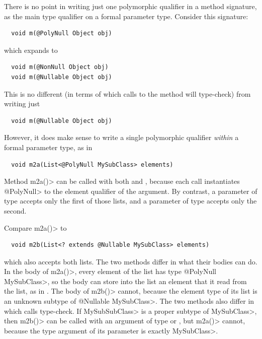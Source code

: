 
There is no point in writing just one polymorphic qualifier in a method
signature, as the main type qualifier on a formal parameter type.
Consider this signature:

\begin{Verbatim}
  void m(@PolyNull Object obj)
\end{Verbatim}

\noindent
which expands to

\begin{Verbatim}
  void m(@NonNull Object obj)
  void m(@Nullable Object obj)
\end{Verbatim}

This is no different (in terms of which calls to the method will
type-check) from writing just

\begin{Verbatim}
  void m(@Nullable Object obj)
\end{Verbatim}

However, it does make sense to write a single polymorphic qualifier
\emph{within} a formal parameter type, as in
\begin{Verbatim}
  void m2a(List<@PolyNull MySubClass> elements)
\end{Verbatim}
Method \<m2a()> can be called with both 
and , because each call instantiates
\<@PolyNull> to the element qualifier of the argument.  By contrast, a
parameter of type  accepts only the first
of those lists, and a parameter of type 
accepts only the second.

Compare \<m2a()> to
\begin{Verbatim}
  void m2b(List<? extends @Nullable MySubClass> elements)
\end{Verbatim}
which also accepts both lists.  The two methods differ in what their bodies
can do.  In the body of \<m2a()>, every element of the list has type
\<@PolyNull MySubClass>, so the body can store into the list an element
that it read from the list, as in .  The
body of \<m2b()> cannot, because the element type of its list is an unknown
subtype of \<@Nullable MySubClass>.  The two methods also differ in which
calls type-check.  If \<MySubSubClass> is a proper subtype of
\<MySubClass>, then \<m2b()> can be called with an argument of type
 or , but \<m2a()> cannot, because the type argument of its
parameter is exactly \<MySubClass>.



